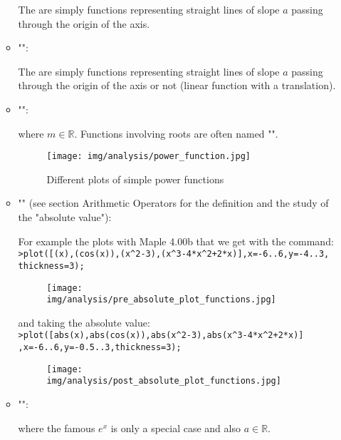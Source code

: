 \begin{enumerate}
\begin{itemize}
			The are simply functions representing straight lines of slope $a$ passing through the origin of the axis.
			
			\item "":
			
			The are simply functions representing straight lines of slope $a$ passing through the origin of the axis or not (linear function with a translation).
						
			\item "":
			
			where $m\in\mathbb{R}$. Functions involving roots are often named "".
			\begin{figure}[H]
				\centering
				\texttt{[image: img/analysis/power\_function.jpg]}
				\caption{Different plots of simple power functions}
			\end{figure}
		
			\item "" (see section Arithmetic Operators for the definition and the study of the "absolute value"):
			
			For example the plots with Maple 4.00b that we get with the command:\\
			
			\texttt{>plot([(x),(cos(x)),(x\string^2-3),(x\string^3-4*x\string^2+2*x)],x=-6..6,y=-4..3,\\
			thickness=3);}	
			
			\begin{figure}[H]
				\centering
				\texttt{[image: img/analysis/pre\_absolute\_plot\_functions.jpg]}
			\end{figure}
			
			and taking the absolute value:\\
			
			\texttt{>plot([abs(x),abs(cos(x)),abs(x\string^2-3),abs(x\string^3-4*x\string^2+2*x)]\\
			,x=-6..6,y=-0.5..3,thickness=3);}
			\begin{figure}[H]
				\centering
				\texttt{[image: img/analysis/post\_absolute\_plot\_functions.jpg]}
			\end{figure}
		
		\item "":
			
			where the famous $e^x$ is only a special case and also $a\in\mathbb{R}$.
			

\end{itemize}
\end{enumerate}
